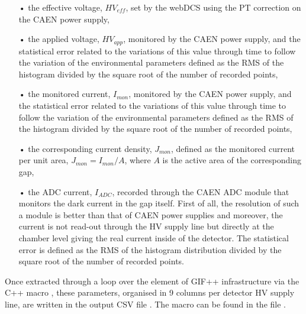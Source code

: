 	\begin{itemize}
		\item[•] the effective voltage, $HV_{eff}$, set by the webDCS using the PT correction on the CAEN power supply,
		\item[•] the applied voltage, $HV_{app}$, monitored by the CAEN power supply, and the statistical error related to the variations of this value through time to follow the variation of the environmental parameters defined as the RMS of the histogram divided by the square root of the number of recorded points,
		\item[•] the monitored current, $I_{mon}$, monitored by the CAEN power supply, and the statistical error related to the variations of this value through time to follow the variation of the environmental parameters defined as the RMS of the histogram divided by the square root of the number of recorded points,
		\item[•] the corresponding current density, $J_{mon}$, defined as the monitored current per unit area, $J_{mon} = I_{mon}/A$, where $A$ is the active area of the corresponding gap,
		\item[•] the ADC current, $I_{ADC}$, recorded through the CAEN ADC module that monitors the dark current in the gap itself. First of all, the resolution of such a module is better than that of CAEN power supplies and moreover, the current is not read-out through the HV supply line but directly at the chamber level giving the real current inside of the detector. The statistical error is defined as the RMS of the histogram distribution divided by the square root of the number of recorded points.
	\end{itemize}
	
	Once extracted through a loop over the element of GIF++ infrastructure via the C++ macro , these parameters, organised in 9 columns per detector HV supply line, are written in the output CSV file . The macro can be found in the file .
